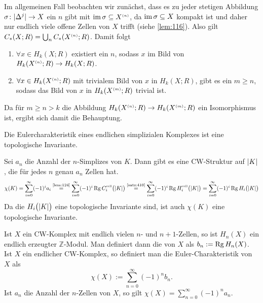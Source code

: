 \begin{beweis}
\begin{enumerate}[a)]
		Im allgemeinen Fall beobachten wir zunächst, dass es zu jeder stetigen Abbildung $\sigma\colon\abs{\Delta^j}\to X$ ein $n$ gibt mit 
		$\im \sigma \subseteq X^\ssbrace{n}$, da $\im \sigma \subseteq X$ kompakt ist und daher nur endlich viele offene Zellen von $X$ trifft (siehe \autoref{lem:116}).
		Also gilt
		\(
			C_*(X;R) = \bigcup_n C_*(X^\ssbrace{n};R)
		\).
		Damit folgt \begin{enumerate}[(1)]
			\item $\forall x \in H_k(X;R) $ existiert ein $n$, sodass $x$ im Bild von $ H_k(X^\ssbrace{n};R) \to H_k(X;R)$.
			\item $\forall x\in H_k(X^\ssbrace{n};R)$ mit trivialem Bild von $x$ in $H_k(X;R)$, gibt es ein $m \ge n$, sodass das Bild von $x$ in $H_k(X^\ssbrace{m};R)$
			trivial ist.
		\end{enumerate}
		Da für $m \ge n >k$ die Abbildung $H_k(X^\ssbrace{n};R) \to H_k(X^\ssbrace{m};R)$ ein Isomorphismus ist, ergibt sich damit die Behauptung. \qedhere 
	\end{enumerate}
\end{beweis}

\begin{korollar}[{name=[Die Eulercharakteristik ist eine topologische Invariante]},label=kor:129]
	Die Eulercharakteristik eines endlichen simplizialen Komplexes ist eine topologische Invariante.
\end{korollar}
\begin{beweis}
	Sei $a_n$ die Anzahl der $n$-Simplizes von $K$. 
	Dann gibt es eine CW-Struktur auf $\abs*{K}$, die für jedes $n$ genau $a_n$ Zellen hat.
	\[
		\chi(K) = \sum_{i=0}^{\infty} (-1)^i a_i \StackText{\ref{lem:124}}{=} \sum_{i=0}^{\infty} (-1)^i \Rg C_i^\cell \enbrace[\big]{\abs*{K}} 
		\StackText{\ref{satz:410}}{=}
		\sum_{i=0}^{\infty} (-1)^i \Rg H_i^\cell \enbrace[\big]{\abs*{K}} = \sum_{i=0}^{\infty} (-1)^i \Rg H_i \enbrace[\big]{\abs*{K} }    
	\]
	Da die $H_i \enbrace[\big]{\abs*{K}}$ eine topologische Invariante sind, ist auch $\chi(K)$ eine topologische Invariante.
\end{beweis}

\begin{bemerkung}[{name=[{n-te Bettizahl und Eulercharakteristik eines CW-Komplexes}]}]
	Ist $X$ ein CW-Komplex mit endlich vielen $n$- und $n+1$-Zellen, so ist $H_n(X)$ ein endlich erzeugter $\mathbb{Z}$-Modul. 
	Man definiert dann die  von $X$ als $b_n := \Rg H_n(X)$. 
	Ist $X$ ein endlicher CW-Komplex, so definiert man die Euler-Charakteristik von $X$ als
	\[
		\chi(X) := \sum_{n=0}^{\infty} (-1)^{n} b_n.
	\]
	Ist $a_n$ die Anzahl der $n$-Zellen von $X$, so gilt $\chi(X)=\sum_{n=0}^{\infty} (-1)^n a_n$.
\end{bemerkung}

